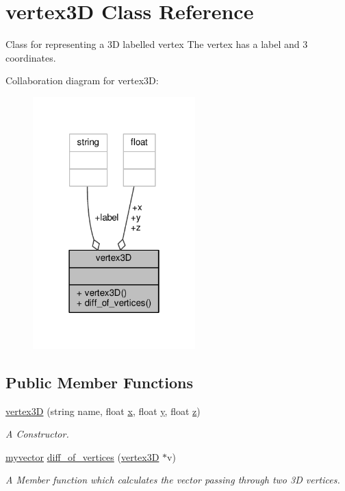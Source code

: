 \hypertarget{classvertex3D}{}\section{vertex3D Class Reference}
\label{classvertex3D}


Class for representing a 3D labelled vertex The vertex has a label and 3 coordinates.  




Collaboration diagram for vertex3D\+:\nopagebreak
\begin{figure}[H]
\begin{center}
\leavevmode
\includegraphics[width=178pt]{classvertex3D__coll__graph}
\end{center}
\end{figure}
\subsection*{Public Member Functions}
\begin{DoxyCompactItemize}
\item 
\hyperlink{classvertex3D_a82301ce369a5bff49f467f73b93e3d67}{vertex3D} (string name, float \hyperlink{classvertex3D_a6c6ee4315d72adbc5abb17e6af802087}{x}, float \hyperlink{classvertex3D_aa1f4823bf2a3f648b1b0b39ef7ea5891}{y}, float \hyperlink{classvertex3D_a67f3819dff895cb47284c34ec85658d7}{z})
\begin{DoxyCompactList}\small\item\em A Constructor. \end{DoxyCompactList}\item 
\hyperlink{classmyvector}{myvector} \hyperlink{classvertex3D_aaf451bdb095243ff34d788648aa8ff29}{diff\+\_\+of\+\_\+vertices} (\hyperlink{classvertex3D}{vertex3D} $\ast$v)
\begin{DoxyCompactList}\small\item\em A Member function which calculates the vector passing through two 3D vertices. \end{DoxyCompactList}\end{DoxyCompactItemize}
